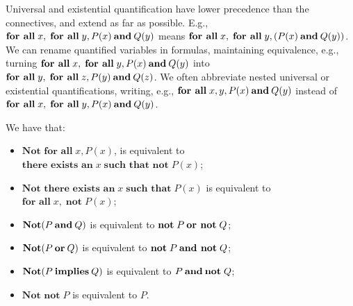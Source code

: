 Universal and existential quantification have lower precedence
than the connectives, and extend as far as possible. E.g.,
$\textbf{for all}\; x, \;\textbf{for all}\; y, P(x)\mathbin{\mathbf{and}} Q(y)$ means
$\textbf{for all}\; x, \;\textbf{for all}\; y, (P(x)\mathbin{\mathbf{and}} Q(y))$.
We can rename quantified variables in formulas, maintaining equivalence,
e.g., turning
$\textbf{for all}\; x, \;\textbf{for all}\; y, P(x)\mathbin{\mathbf{and}} Q(y)$ into
$\textbf{for all}\; y, \;\textbf{for all}\; z, P(y)\mathbin{\mathbf{and}} Q(z)$.
We often abbreviate nested universal or existential quantifications,
writing, e.g., 
$\textbf{for all}\; x, y, P(x)\mathbin{\mathbf{and}} Q(y)$ instead of
$\textbf{for all}\; x, \;\textbf{for all}\; y, P(x)\mathbin{\mathbf{and}} Q(y)$.

We have that:
\begin{itemize}
\item $\textbf{Not for all}\; x, P(x)$, is equivalent to
  $\textbf{there exists an}\; x \;\textbf{such that not}\; P(x)$;

\item $\textbf{Not there exists an}\; x \;\textbf{such that}\; P(x)$ is
  equivalent to $\textbf{for all}\; x, \;\textbf{not}\; P(x)$;

\item $\textbf{Not} (P \mathbin{\mathbf{and}} Q)$ is equivalent to
  $\textbf{not}\; P \mathbin{\mathbf{or}} \,\textbf{not}\; Q$;

\item $\textbf{Not} (P \mathbin{\mathbf{or}} Q)$ is equivalent to $\textbf{not}\;
  P \mathbin{\mathbf{and}} \,\textbf{not}\; Q$;

\item $\textbf{Not} (P \mathbin{\mathbf{implies}} Q)$ is equivalent to $P
  \mathbin{\mathbf{and}} \textbf{not}\; Q$;

\item $\textbf{Not not}\; P$ is equivalent to $P$.
\end{itemize}

